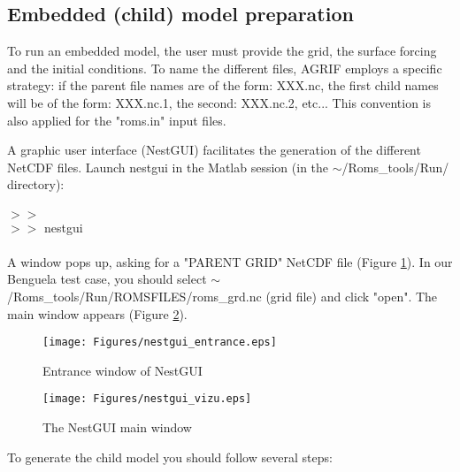 \subsection{Embedded (child) model preparation}

To run an embedded model, the user must provide the grid, the surface 
forcing and the initial conditions. To name the different files,
AGRIF employs a specific strategy: if the parent file names are of
the form: XXX.nc, the first child names will be of the form: 
XXX.nc.1, the second: XXX.nc.2, etc... 
This convention is also applied for the "roms.in" input files.

A graphic user interface (NestGUI) facilitates the generation of 
the different NetCDF files. Launch nestgui in the Matlab session 
(in the $\sim$/Roms\_tools/Run/ directory):
\\ \\
$>>$\\
$>>$ nestgui
\\ \\
A window pops up, asking for a "PARENT GRID" NetCDF file 
(Figure \ref{fig:nestgui3}). In our Benguela test case, you should select 
$\sim$/Roms\_tools/Run/ROMSFILES/roms\_grd.nc (grid file) and click "open".
The main window appears (Figure \ref{fig:nestgui4}).

\begin{figure}[!ht]
\centering
\texttt{[image: Figures/nestgui\_entrance.eps]}
\caption{Entrance window of NestGUI}
\label{fig:nestgui3}
\end{figure}

\begin{figure}[!ht]
\centering
\texttt{[image: Figures/nestgui\_vizu.eps]}
\caption{The NestGUI main window}
\label{fig:nestgui4}
\end{figure} 


To generate the child model you should follow several steps:

